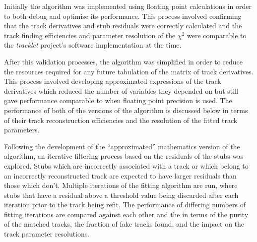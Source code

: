 Initially the algorithm was implemented using floating point calculations in order to both debug and optimise its performance.
This process involved confirming that the track derivatives and stub residuals were correctly calculated and the track finding efficiencies and parameter resolution of the $\chi^{2}$ were comparable to the \emph{tracklet} project's software implementation at the time.

After this validation processes, the algorithm was simplified in order to reduce the resources required for any future tabulation of the matrix of track derivatives.
This process involved developing approximated expressions of the track derivatives which reduced the number of variables they depended on but still gave performance comparable to when floating point precision is used.
The performance of both of the versions of the algorithm is discussed below in terms of their track reconstruction efficiencies and the resolution of the fitted track parameters.

Following the development of the ``approximated'' mathematics version of the algorithm, an iterative filtering process based on the residuals of the stubs was explored.
Stubs which are incorrectly associated with a track or which belong to an incorrectly reconstructed track are expected to have larger residuals than those which don't.
Multiple iterations of the fitting algorithm are run, where stubs that have a residual above a threshold value being discarded after each iteration prior to the track being refit.
The performance of differing numbers of fitting iterations are compared against each other and the \KF in terms of the purity of the matched tracks, the fraction of fake tracks found, and the impact on the track parameter resolutions.


\begin{table}[htbp]

\label{tab:chi2-exactVsApprox}
 \centering
\end{table}

